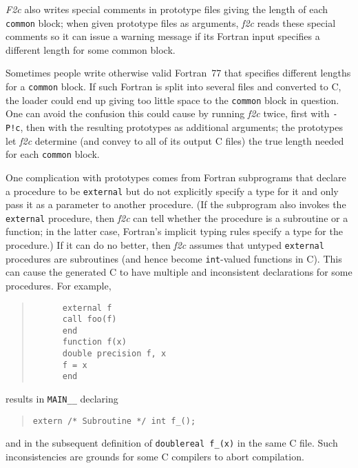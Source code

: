 \documentclass[10pt,a4paper]{article}
\begin{document}
\emph{F2c} also writes special comments in prototype files giving the length of each \verb|common| block; when given prototype files as arguments, \emph{f2c} reads these special comments so it can issue a warning message if its Fortran input specifies a different length for some common block.

Sometimes people write otherwise valid Fortran~77 that specifies different lengths for a \verb|common| block. If such Fortran is split into several files and converted to C, the loader could end up giving too little space to the \verb|common| block in question. One can avoid the confusion this could cause by running \emph{f2c} twice, first with \verb|-P!c|, then with the resulting prototypes as additional arguments; the prototypes let \emph{f2c} determine (and convey to all of its output C files) the true length needed for each \verb|common| block.

One complication with prototypes comes from Fortran subprograms that declare a procedure to be \verb|external| but do not explicitly specify a type for it and only pass it as a parameter to another procedure. (If the subprogram also invokes the \verb|external| procedure, then \emph{f2c} can tell whether the procedure is a subroutine or a function; in the latter case, Fortran’s implicit typing rules specify a type for the procedure.) If it can do no better, then \emph{f2c} assumes that untyped \verb|external| procedures are subroutines (and hence become \verb|int|-valued functions in C). This can cause the generated C to have multiple and inconsistent declarations for some procedures. For example,
\begin{quote}
\begin{verbatim}
      external f
      call foo(f)
      end
      function f(x)
      double precision f, x
      f = x
      end
\end{verbatim}
\end{quote}
results in \verb|MAIN__| declaring
\begin{quote}
\begin{verbatim}
extern /* Subroutine */ int f_();
\end{verbatim}
\end{quote}
and in the subsequent definition of \verb|doublereal f_(x)| in the same C file. Such inconsistencies are grounds for some C compilers to abort compilation.
\end{document}

